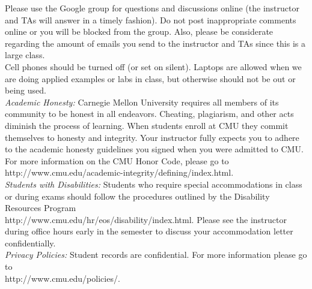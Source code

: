 \documentclass[11pt]{article}
\begin{document}
Please use the Google group for questions and discussions online (the instructor and TAs will answer in a timely fashion). Do not post inappropriate comments online or you will be blocked from the group. Also, please be considerate regarding the amount of emails you send to the instructor and TAs since this is a large class. \\





Cell phones should be turned off (or set on silent). Laptops are allowed when we are doing applied examples or labs in class, but otherwise should not be out or being used. \\


\emph{Academic Honesty:} Carnegie Mellon University requires all members of 
its community to be honest in all endeavors. Cheating, plagiarism, and other 
acts diminish the process of learning. When students enroll at CMU they commit themselves to honesty and integrity. Your instructor fully expects you to 
adhere to the academic honesty guidelines you signed when you were admitted to CMU. 
For more information on the CMU Honor Code, please go to http://www.cmu.edu/academic-integrity/defining/index.html. \\


\emph{Students with Disabilities:} Students who require special accommodations in class or during exams should follow the procedures outlined by the Disability Resources Program \\ http://www.cmu.edu/hr/eos/disability/index.html.  Please see the instructor during office hours early in the semester to discuss your accommodation letter confidentially.\\

\emph{Privacy Policies:} 
Student records are confidential. For more information please go to \\http://www.cmu.edu/policies/.\\

\end{document}
